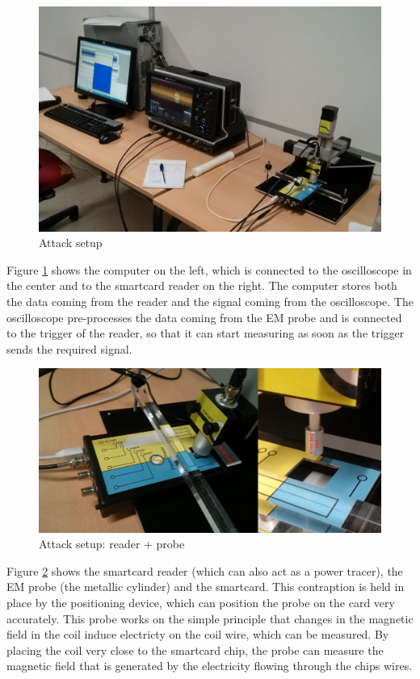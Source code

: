 \documentclass{llncs}
\begin{document}
\begin{figure}
    \centering
    \includegraphics[width=\textwidth]{img/IMG_20140523_171003}
    \caption[]{Attack setup}
    \label{fig:setup}
\end{figure}

Figure \ref{fig:setup} shows the computer on the left, which is connected to the oscilloscope in the center and to the smartcard reader on the right. The computer stores both the data coming from the reader and the signal coming from the oscilloscope. The oscilloscope pre-processes the data coming from the EM probe and is connected to the trigger of the reader, so that it can start measuring as soon as the trigger sends the required signal.

\begin{figure}
    \centering
    \includegraphics[width=\textwidth]{img/setup_probe}
    \caption[]{Attack setup: reader + probe}
    \label{fig:setupreader}
\end{figure}

Figure \ref{fig:setupreader} shows the smartcard reader (which can also act as a power tracer), the EM probe (the metallic cylinder) and the smartcard. This contraption is held in place by the positioning device, which can position the probe on the card very accurately. This probe works on the simple principle that changes in the magnetic field in the coil induce electricty on the coil wire, which can be measured. %
By placing the coil very close to the smartcard chip, the probe can measure the magnetic field that is generated by the electricity flowing through the chips wires.
\end{document}

